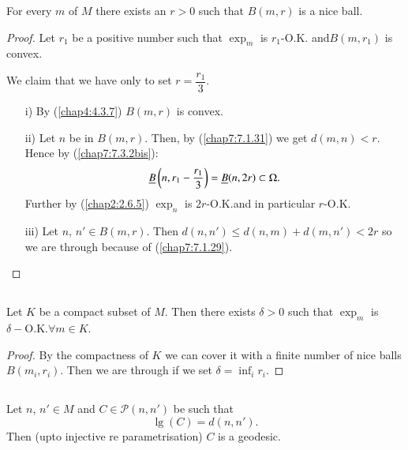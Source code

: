\begin{theorem*}
For every $m$ of $M$ there exists an $r>0$ such that $B(m,r)$ is a
nice ball.
\end{theorem*}

\begin{proof}
Let $r_{1}$ be a positive number such that $\exp_{m}$ is
$r_{1}$-O.K\@. and\break $B(m,r_{1})$ is convex.

We claim that we have only to set $r=\dfrac{r_{1}}{3}$.
\begin{itemize}
\item[\rm i)] By (\ref{chap4:4.3.7}) $B(m,r)$ is convex.

\item[\rm ii)] Let $n$ be in $B(m,r)$. Then, by (\ref{chap7:7.1.31}) we
  get $d(m,n)<r$. Hence by (\ref{chap7:7.3.2bis}):
$$
\underline{B}\left(n,r_{1}-\frac{r_{1}}{3}\right)=\underline{B}(n,2r)\subset \Omega.
$$
Further by (\ref{chap2:2.6.5}) $\exp_{n}$ is $2r$-O.K.\@ and in
particular $r$-O.K.

\item[\rm iii)] Let $n$, $n'\in B(m,r)$. Then $d(n,n')\leq
  d(n,m)+d(m,n')<2r$ so we are through because of (\ref{chap7:7.1.29}).
\end{itemize}
\end{proof}

\subsection{}\label{chap7:7.3.4}

\begin{coro*}
Let \pageoriginale $K$ be a compact subset of $M$. Then there exists
$\delta>0$ such that $\exp_{m}$ is $\delta-\text{O.K.}\forall m\in K$.
\end{coro*}

\begin{proof}
By the compactness of $K$ we can cover it with a finite number of nice
balls $B(m_{i},r_{i})$. Then we are through if we set
$\delta=\inf_{i}r_{i}$. 
\end{proof}

\subsection{}\label{chap7:7.3.5}

\begin{coro*}
Let $n$, $n'\in M$ and $C\in\mathscr{P}(n,n')$ be such that
$$
\lg(C)=d(n,n').
$$
Then (upto injective re parametrisation) $C$ is a geodesic.
\end{coro*}

